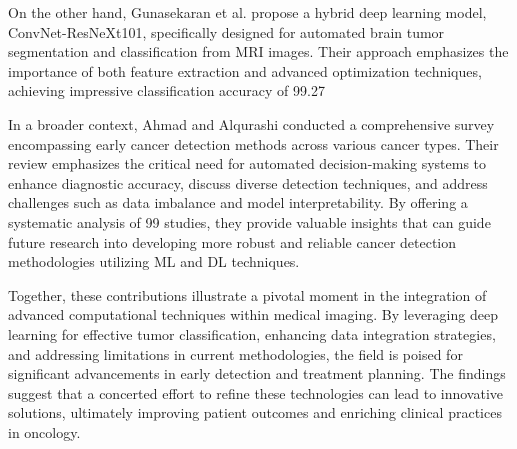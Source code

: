 \documentclass[runningheads]{llncs}
\begin{document}
On the other hand, Gunasekaran et al. \cite{Subathra_2024} propose a hybrid deep learning model, ConvNet-ResNeXt101, specifically designed for automated brain tumor segmentation and classification from MRI images. Their approach emphasizes the importance of both feature extraction and advanced optimization techniques, achieving impressive classification accuracy of 99.27%

In a broader context, Ahmad and Alqurashi \cite{Istiak_2024} conducted a comprehensive survey encompassing early cancer detection methods across various cancer types. Their review emphasizes the critical need for automated decision-making systems to enhance diagnostic accuracy, discuss diverse detection techniques, and address challenges such as data imbalance and model interpretability. By offering a systematic analysis of 99 studies, they provide valuable insights that can guide future research into developing more robust and reliable cancer detection methodologies utilizing ML and DL techniques.

Together, these contributions illustrate a pivotal moment in the integration of advanced computational techniques within medical imaging. By leveraging deep learning for effective tumor classification, enhancing data integration strategies, and addressing limitations in current methodologies, the field is poised for significant advancements in early detection and treatment planning. The findings suggest that a concerted effort to refine these technologies can lead to innovative solutions, ultimately improving patient outcomes and enriching clinical practices in oncology.
\end{document}
